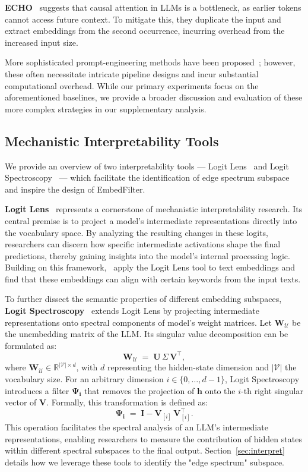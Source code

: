 \documentclass{llmxive}
\providecommand{\bm}[1]{\boldsymbol{#1}}
\providecommand{\name}{EmbedFilter}
\providecommand{\vh}{{\bm{h}}}
\providecommand{\mI}{{\bm{I}}}
\providecommand{\mU}{{\bm{U}}}
\providecommand{\mV}{{\bm{V}}}
\providecommand{\mW}{{\bm{W}}}
\begin{document}
\textbf{ECHO}~\cite{echo} suggests that causal attention in LLMs is a bottleneck, as earlier tokens cannot access future context. 
To mitigate this, they duplicate the input and extract embeddings from the second occurrence, incurring overhead from the increased input size.

More sophisticated prompt-engineering methods have been proposed~\cite{metaeol,geneol}; however, these often necessitate intricate pipeline designs and incur substantial computational overhead. While our primary experiments focus on the aforementioned baselines, we provide a broader discussion and evaluation of these more complex strategies in our supplementary analysis.


\subsection{Mechanistic Interpretability Tools}
We provide an overview of two interpretability tools --- Logit Lens~\cite{logitlens} and Logit Spectroscopy~\cite{spectral} --- which facilitate the identification of edge spectrum subspace and inspire the design of \name.

\textbf{Logit Lens}~\cite{logitlens} represents a cornerstone of mechanistic interpretability research. 
Its central premise is to project a model’s intermediate representations directly into the vocabulary space.
By analyzing the resulting changes in these logits, researchers can discern how specific intermediate activations shape the final predictions, thereby gaining insights into the model's internal processing logic.
Building on this framework, \citet{nie2024text}~apply the Logit Lens tool to text embeddings and find that these embeddings can align with certain keywords from the input texts.

To further dissect the semantic properties of different embedding subspaces, 
\textbf{Logit Spectroscopy}~\citep{spectral} extends Logit Lens by projecting intermediate representations onto spectral components of model’s weight matrices.
Let \(\mW_\mathcal{U}\) be the unembedding matrix of the LLM. 
Its singular value decomposition can be formulated as:
{ \Large \begin{equation*}
    \label{eq:svd}
    \mW_\mathcal{U} \; = \; \mU \, \Sigma \, \mV^\top,
\end{equation*}}
where \(\bm{W_\mathcal{U}} \in \mathbb{R}^{\left | \mathcal{V}\right | \times d}\), with \(d\) representing the hidden-state dimension and \(|\mathcal{V}|\) the vocabulary size.
For an arbitrary dimension $i \in \{0, \dots, d-1\}$, Logit Spectroscopy introduces a filter \(\bm{\Psi_i}\) that removes the projection of \(\vh\) onto the \(i\)-th right singular vector of \(\mV\). 
Formally, this transformation is defined as:
{\Large \[
    {\bm{\Psi_i}} \; = \; {\mI - \mV_{[i]} \, \mV_{[i]}^{\top}}.
\]}
This operation facilitates the spectral analysis of an LLM's intermediate representations, enabling researchers to measure the contribution of hidden states within different spectral subspaces to the final output.
Section~\ref{sec:interpret} details how we leverage these tools to identify the "edge spectrum" subspace.
\end{document}
